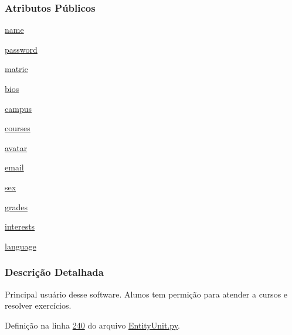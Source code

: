 \subsubsection*{Atributos Públicos}
\begin{DoxyCompactItemize}
\item 
\hyperlink{classELO_1_1EntityUnit_1_1Student_a33329ec1da0181f6305626b4444a8e0b}{name}
\item 
\hyperlink{classELO_1_1EntityUnit_1_1Student_a834cad492221bfe3f26e590666e13f9a}{password}
\item 
\hyperlink{classELO_1_1EntityUnit_1_1Student_a7a58dc9ae8d071372ef2036a82fcb3ae}{matric}
\item 
\hyperlink{classELO_1_1EntityUnit_1_1Student_a148e46f8d5bb2a3dedb9590edbb2471e}{bios}
\item 
\hyperlink{classELO_1_1EntityUnit_1_1Student_aeff51011a4e35705fb6aefc54e1d4f35}{campus}
\item 
\hyperlink{classELO_1_1EntityUnit_1_1Student_a4fc13f8b92b03ab40b6f97e753109056}{courses}
\item 
\hyperlink{classELO_1_1EntityUnit_1_1Student_a63479fe42a5a5e1dffc988221a807a6a}{avatar}
\item 
\hyperlink{classELO_1_1EntityUnit_1_1Student_ac072120adf3ee4078fe3ef7f17e61a1f}{email}
\item 
\hyperlink{classELO_1_1EntityUnit_1_1Student_a5ca85c1d00044512e5dc3cfabac4ff9f}{sex}
\item 
\hyperlink{classELO_1_1EntityUnit_1_1Student_a7ab2e46886024eced2bc61195dbc2008}{grades}
\item 
\hyperlink{classELO_1_1EntityUnit_1_1Student_a8777212f16975f658ff8f75e47f2c554}{interests}
\item 
\hyperlink{classELO_1_1EntityUnit_1_1Student_ad58a5d0f4e75b34e6c2b93ac05b59faf}{language}
\end{DoxyCompactItemize}


\subsubsection{Descrição Detalhada}
Principal usuário desse software. Alunos tem permição para atender a cursos e resolver exercícios. 

Definição na linha \hyperlink{EntityUnit_8py_source_l00240}{240} do arquivo \hyperlink{EntityUnit_8py_source}{Entity\-Unit.\-py}.



